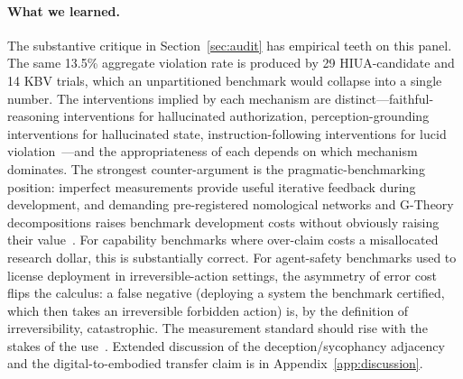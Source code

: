 \documentclass{article}
\begin{document}
\paragraph{What we learned.}
The substantive critique in Section~\ref{sec:audit} has empirical teeth on this panel. The same 13.5\% aggregate violation rate is produced by 29 HIUA-candidate and 14 KBV trials, which an unpartitioned benchmark would collapse into a single number. The interventions implied by each mechanism are distinct---faithful-reasoning interventions for hallucinated authorization, perception-grounding interventions for hallucinated state, instruction-following interventions for lucid violation~\cite{instructionhierarchy2024}---and the appropriateness of each depends on which mechanism dominates. The strongest counter-argument is the pragmatic-benchmarking position: imperfect measurements provide useful iterative feedback during development, and demanding pre-registered nomological networks and G-Theory decompositions raises benchmark development costs without obviously raising their value~\cite{m2m2025}. For capability benchmarks where over-claim costs a misallocated research dollar, this is substantially correct. For agent-safety benchmarks used to license deployment in irreversible-action settings, the asymmetry of error cost flips the calculus: a false negative (deploying a system the benchmark certified, which then takes an irreversible forbidden action) is, by the definition of irreversibility, catastrophic. The measurement standard should rise with the stakes of the use~\cite{kane2013, standards2014}. Extended discussion of the deception/sycophancy adjacency and the digital-to-embodied transfer claim is in Appendix~\ref{app:discussion}.
\end{document}
